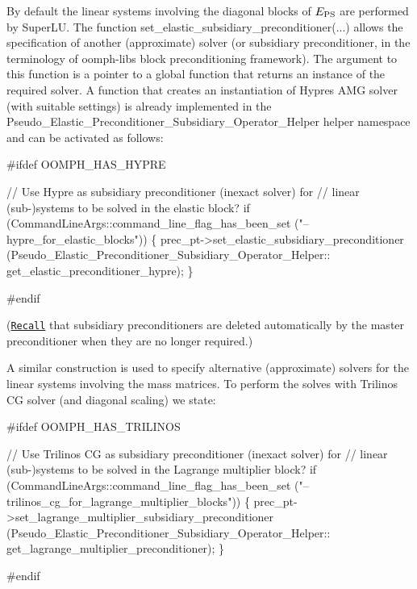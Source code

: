 By default the linear systems involving the diagonal blocks of $ E_{\rm PS} $ are performed by Super\+LU. The function {\ttfamily set\+\_\+elastic\+\_\+subsidiary\+\_\+preconditioner}(...) allows the specification of another (approximate) solver (or subsidiary preconditioner, in the terminology of {\ttfamily oomph-\/lib\textquotesingle{}s} block preconditioning framework). The argument to this function is a pointer to a global function that returns an instance of the required solver. A function that creates an instantiation of Hypre\textquotesingle{}s A\+MG solver (with suitable settings) is already implemented in the {\ttfamily Pseudo\+\_\+\+Elastic\+\_\+\+Preconditioner\+\_\+\+Subsidiary\+\_\+\+Operator\+\_\+\+Helper} helper namespace and can be activated as follows\+:


\begin{DoxyCodeInclude}

\textcolor{preprocessor}{#ifdef OOMPH\_HAS\_HYPRE}

 \textcolor{comment}{// Use Hypre as subsidiary preconditioner (inexact solver) for}
 \textcolor{comment}{// linear (sub-)systems to be solved in the elastic block?}
 \textcolor{keywordflow}{if} (CommandLineArgs::command\_line\_flag\_has\_been\_set
     (\textcolor{stringliteral}{"--hypre\_for\_elastic\_blocks"}))
  \{
   prec\_pt->set\_elastic\_subsidiary\_preconditioner
    (Pseudo\_Elastic\_Preconditioner\_Subsidiary\_Operator\_Helper::
     get\_elastic\_preconditioner\_hypre);
  \}

\textcolor{preprocessor}{#endif}

\end{DoxyCodeInclude}


(\href{../../../../doc/mpi/distributed_general_purpose_block_preconditioners/html/index.html#application}{\tt Recall} that subsidiary preconditioners are deleted automatically by the master preconditioner when they are no longer required.)

A similar construction is used to specify alternative (approximate) solvers for the linear systems involving the mass matrices. To perform the solves with Trilinos\textquotesingle{} CG solver (and diagonal scaling) we state\+:


\begin{DoxyCodeInclude}


\textcolor{preprocessor}{#ifdef OOMPH\_HAS\_TRILINOS}

 \textcolor{comment}{// Use Trilinos CG as subsidiary preconditioner (inexact solver) for}
 \textcolor{comment}{// linear (sub-)systems to be solved in the Lagrange multiplier block?}
 \textcolor{keywordflow}{if} (CommandLineArgs::command\_line\_flag\_has\_been\_set
     (\textcolor{stringliteral}{"--trilinos\_cg\_for\_lagrange\_multiplier\_blocks"}))
  \{
   prec\_pt->set\_lagrange\_multiplier\_subsidiary\_preconditioner
    (Pseudo\_Elastic\_Preconditioner\_Subsidiary\_Operator\_Helper::
     get\_lagrange\_multiplier\_preconditioner);
  \}

\textcolor{preprocessor}{#endif}

\end{DoxyCodeInclude}


